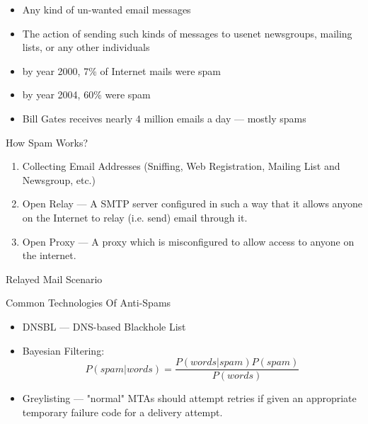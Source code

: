 \begin{frame}{}
  \begin{itemize}
  \item Any kind of un-wanted email messages
  \item The action of sending such kinds of messages to usenet newsgroups, mailing lists,
    or any other individuals
  \item by year 2000, 7\% of Internet mails were spam
  \item by year 2004, 60\% were spam
  \item Bill Gates receives nearly 4 million emails a day --- mostly spams
  \end{itemize}
\end{frame}

\begin{frame}{How Spam Works?}
  \begin{enumerate}
  \item Collecting Email Addresses (Sniffing, Web Registration, Mailing List and
    Newsgroup, etc.)
  \item Open Relay --- A SMTP server configured in such a way that it allows anyone on
    the Internet to relay (i.e. send) email through it.
  \item Open Proxy --- A proxy which is misconfigured to allow access to anyone on the
    internet.
  \end{enumerate}
\end{frame}

\begin{frame}{Relayed Mail Scenario}
  \centering
  \mode<beamer>{ \texttt{[image: smtp-relay]} }%
  \label{fig:relay}
\end{frame}


\begin{frame}{Common Technologies Of Anti-Spams}
  \begin{itemize}
  \item DNSBL --- DNS-based Blackhole List
  \item Bayesian Filtering: $$P(spam|words) = \frac{P(words|spam)P(spam)}{P(words)}$$
  \item Greylisting --- "normal" MTAs should attempt retries if given an appropriate
    temporary failure code for a delivery attempt.
  \end{itemize}
\end{frame}

